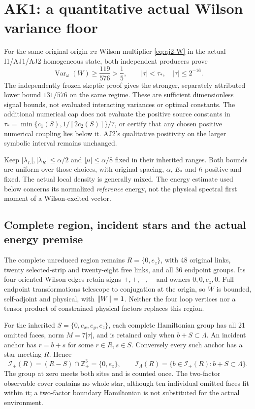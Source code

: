 \section{AK1: a quantitative actual Wilson variance floor\workstar}
\label{sec:ak1}
For the same original origin $xz$ Wilson multiplier \eqref{eq:aj2-W} in the actual I1/AJ1/AJ2 homogeneous state, both independent producers prove
\begin{equation}
 \operatorname{Var}_{\omega}(W)\ge\frac{119}{576}>\frac15,
 \qquad |\tau|<\tau_*,\quad |\tau|\le2^{-16}.
 \label{eq:ak1-common}
\end{equation}
The independently frozen skeptic proof gives the stronger, separately attributed lower bound $131/576$ on the same regime. These are sufficient dimensionless signal bounds, not evaluated interacting variances or optimal constants. The additional numerical cap does not evaluate the positive source constants in $\tau_*=\min\{c_1(S),1/[2c_2(S)]\}/7$, or certify that any chosen positive numerical coupling lies below it. AJ2's qualitative positivity on the larger symbolic interval remains unchanged.

Keep $|\lambda_L|,|\lambda_R|\le\alpha/2$ and $|\mu|\le\alpha/8$ fixed in their inherited ranges. Both bounds are uniform over those choices, with original spacing, $\alpha$, $E_*$ and $\hbar$ positive and fixed. The actual local density is generally mixed. The energy estimate used below concerns its normalized \emph{reference} energy, not the physical spectral first moment of a Wilson-excited vector.

\subsection{Complete region, incident stars and the actual energy premise}
The complete unreduced region remains $R=\{0,e_z\}$, with 48 original links, twenty selected-strip and twenty-eight free links, and all 36 endpoint groups. Its four oriented Wilson edges retain signs $+,+,-,-$ and owners $0,0,e_z,0$. Full endpoint transformations telescope to conjugation at the origin, so $W$ is bounded, self-adjoint and physical, with $\left\lVert W\right\rVert=1$. Neither the four loop vertices nor a tensor product of constrained physical factors replaces this region.

For the inherited $S=\{0,e_x,e_y,e_z\}$, each complete Hamiltonian group has all 21 omitted faces, norm $M=7|\tau|$, and is retained only when $b+S\subset\Lambda$. An incident anchor has $r=b+s$ for some $r\in R,s\in S$. Conversely every such anchor has a star meeting $R$. Hence
\begin{equation}
 \mathcal I_+(R)=(R-S)\cap\mathbb Z_+^3=\{0,e_z\},\qquad
 \mathcal I_\Lambda(R)=\{b\in\mathcal I_+(R):b+S\subset\Lambda\}.
 \label{eq:ak1-incidence}
\end{equation}
The group at zero meets both sites and is counted once. The two-factor observable cover contains no whole star, although ten individual omitted faces fit within it; a two-factor boundary Hamiltonian is not substituted for the actual environment.

